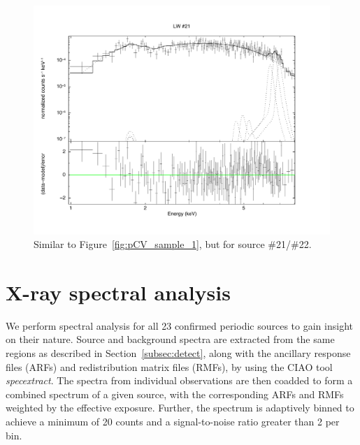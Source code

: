 \documentclass[fleqn,usenatbib]{mnras}
\begin{document}
\begin{figure}
\begin{minipage}[b]{0.44\textwidth}
\includegraphics[width=1.01\textwidth]{./figure/LW/153001_spec.pdf}
\end{minipage}
\caption{Similar to Figure~\ref{fig:pCV_sample_1}, but for source \#21/\#22.}
\label{fig:pCV_sample_2}
\end{figure}

\section{X-ray spectral analysis}\label{sec:spectra}
We perform spectral analysis for all 23 confirmed periodic sources to gain insight on their nature. Source and background spectra are extracted from the same regions as described in Section~\ref{subsec:detect}, along with the ancillary response files (ARFs) and redistribution matrix files (RMFs), by using the CIAO tool \emph{specextract}. 
The spectra from individual observations are then coadded to form a combined spectrum of a given source, with the corresponding ARFs and RMFs weighted by the effective exposure. 
Further, the spectrum is adaptively binned to achieve a minimum of 20 counts and a signal-to-noise ratio greater than 2 per bin.
\end{document}
